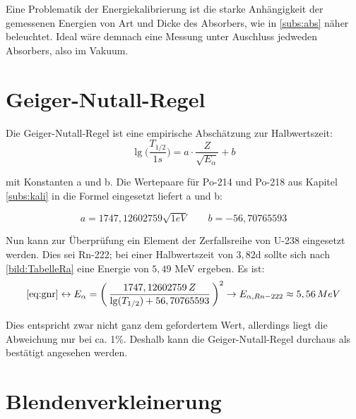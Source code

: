 Eine Problematik der Energiekalibrierung ist die starke Anhängigkeit der gemessenen Energien von Art und Dicke des Absorbers, wie in 
\ref{subs:abs} näher beleuchtet. Ideal wäre demnach eine Messung unter Auschluss jedweden Absorbers, also im Vakuum.\\





\section{Geiger-Nutall-Regel}

Die Geiger-Nutall-Regel ist eine empirische Abschätzung zur Halbwertszeit:\\
\begin{equation}
    \lg \biggl (\frac{T_{1/2}}{1s} \biggl ) = a \cdot \frac{Z}{\sqrt{E_{\alpha}}} + b
    \label{eq:gnr}
\end{equation}


mit Konstanten a und b. Die Wertepaare für Po-214 und Po-218 aus Kapitel \ref{subs:kali} in die Formel eingesetzt liefert a und b:

\begin{equation}
    a = 1747,12602759 \sqrt{1eV} \qquad b = -56,70765593
\end{equation}

Nun kann zur Überprüfung ein Element der Zerfallsreihe von U-238 eingesetzt werden. Dies sei Rn-222; bei einer Halbwertszeit von 
$3,82$d sollte sich nach \ref{bild:TabelleRa} eine Energie von $5,49$ MeV ergeben. Es ist: \\

\begin{equation*}
    \ref{eq:gnr}  \leftrightarrow E_{\alpha} = \biggl(\,\frac{1747,12602759 \, Z}{\lg(T_{1/2})+56,70765593}\, \biggr)^2 \\
    \to E_{\alpha, Rn-222} \approx 5,56 \, MeV
\end{equation*}

Dies entspricht zwar nicht ganz dem gefordertem Wert, allerdings liegt die Abweichung nur bei ca. 1\%. Deshalb kann die 
Geiger-Nutall-Regel durchaus als bestätigt angesehen werden.





\section{Blendenverkleinerung}

